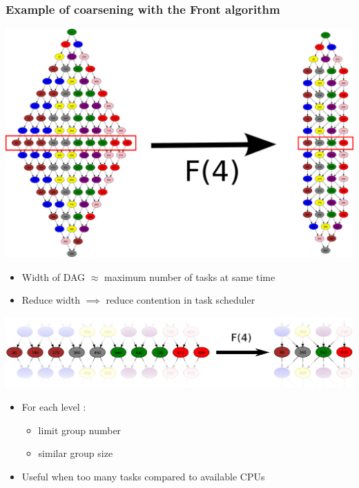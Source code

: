 \documentclass{beamer}
\begin{document}
\begin{frame}[allowframebreaks]
  \frametitle{Example of coarsening with the Front algorithm}
  
  \centerline{\includegraphics[width=0.75\linewidth]{F4}}

  \begin{itemize}
    \item Width of DAG $\approx$ maximum number of tasks at same time
    \item Reduce width $\implies$ reduce contention in task scheduler
  \end{itemize}

\framebreak
    
  \centerline{\includegraphics[width=\linewidth]{F4_zoom}}
  \begin{itemize}
    \item For each level :
    \begin{itemize}
      \item limit group number
      \item similar group size
    \end{itemize}
    \item Useful when too many tasks compared to available CPUs
  \end{itemize}
\end{frame}
\end{document}
